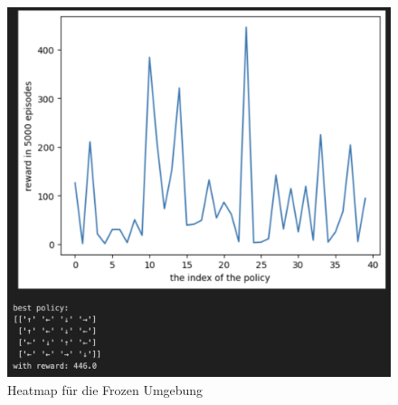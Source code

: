\documentclass[11pt]{article}
\begin{document}
\begin{figure}
    \centering
    \includegraphics[width=\textwidth]{img/3_2_b.png}
    \caption{Heatmap für die Frozen Umgebung}
    \label{img:3_2_b}
\end{figure}
\end{document}
